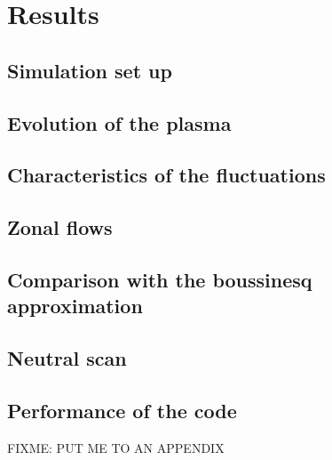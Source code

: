 \documentclass[12pt,a4paper,oneside,openright]{report} %
\begin{document}
\part{Results}

\chapter{Simulation set up}

\chapter{Evolution of the plasma}

\chapter{Characteristics of the fluctuations}

\chapter{Zonal flows}

\chapter{Comparison with the boussinesq approximation}

\chapter{Neutral scan}



\chapter{Performance of the code}
FIXME: PUT ME TO AN APPENDIX

\end{document}
